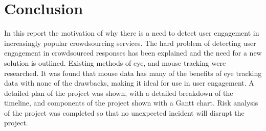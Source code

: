 \documentclass{article}
\begin{document}
\section{Conclusion}





In this report the motivation of why there is a need to detect user engagement in increasingly popular crowdsourcing services.
The hard problem of detecting user engagement in crowdsourced responses has been explained and the need for a new solution is outlined.
Existing methods of eye, and mouse tracking were researched.
It was found that mouse data has many of the benefits of eye tracking data with none of the drawbacks, making it ideal for use in user engagement.
A detailed plan of the project was shown, with a detailed breakdown of the timeline, and components of the project shown with a Gantt chart.
Risk analysis of the project was completed so that no unexpected incident will disrupt the project.


\printbibliography
\end{document}
